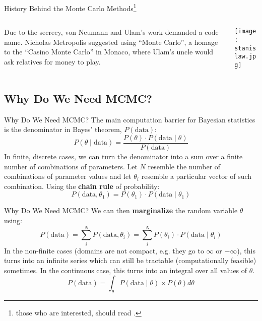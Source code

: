 \begin{frame}{History Behind the Monte Carlo Methods\footnote{those who are interested, should read \textcite{eckhardtStanUlamJohn1987}.}}
	\begin{columns}
		\begin{column}{0.8\textwidth}
			\begin{vfilleditems}
				\item Due to the secrecy, von Neumann and Ulam's work demanded a code name.
				Nicholas Metropolis suggested using ``Monte Carlo'',
				a homage to the ``Casino Monte Carlo'' in Monaco,
				where Ulam's uncle would ask relatives for money to play.
			\end{vfilleditems}
		\end{column}
		\begin{column}{0.2\textwidth}
			\centering
			\texttt{[image: stanislaw.jpg]}
		\end{column}
	\end{columns}
\end{frame}

\subsection{Why Do We Need MCMC?}
\begin{frame}{Why Do We Need MCMC?}
	The main computation barrier for Bayesian statistics is the denominator in Bayes' theorem,
	$P(\text{data})$:
	$$
		P(\theta \mid \text{data})=\frac{P(\theta) \cdot P(\text{data} \mid \theta)}{P(\text{data})}
	$$
	In finite, discrete cases, we can turn the denominator into a sum over a finite number of combinations of parameters.
	Let $N$ resemble the number of combinations of parameter values and let $\theta_i$ resemble a particular vector of such combination. Using the \textbf{chain rule} of probability:
	$$
		P(\text{data}, \theta_1) = P(\theta_1) \cdot P(\text{data} \mid \theta_1)
	$$
\end{frame}

\begin{frame}{Why Do We Need MCMC?}
	We can then \textbf{marginalize} the random variable $\theta$ using:
	$$
		P(\text{data}) = \sum_{i}^N P(\text{data}, \theta_i) = \sum_{i}^N P(\theta_i) \cdot P(\text{data} \mid \theta_i)
	$$
	\vfill
	In the non-finite cases (domains are not compact, e.g. they go to $\infty$ or $-\infty$), this turns into an infinite series which can still be tractable (computationally feasible) sometimes.
	\vfill
	In the continuous case, this turns into an integral over all values of $\theta$.
	$$
		P(\text{data})=\int_{\theta} P(\text{data} \mid \theta) \times P(\theta)d \theta
	$$
\end{frame}

